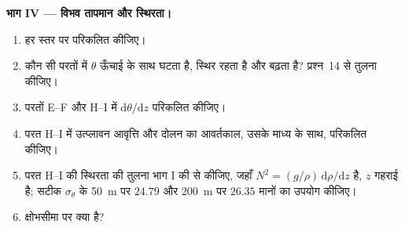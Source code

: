 \begin{problem}
\medskip
\noindent\textbf{भाग IV --- विभव तापमान और स्थिरता।}
\begin{enumerate}[resume]
  \item हर स्तर पर  परिकलित कीजिए।
  \item कौन सी परतों में $\theta$ ऊँचाई के साथ घटता है, स्थिर रहता है और बढ़ता है? प्रश्न~14 से तुलना कीजिए।
  \item परतों E--F और H--I में $\mathrm d\theta/\mathrm dz$ परिकलित कीजिए।
  \item परत H--I में उत्प्लावन आवृत्ति और दोलन का आवर्तकाल, उसके माध्य  के साथ, परिकलित कीजिए।
  \item परत H--I की स्थिरता की तुलना भाग I की  से कीजिए, जहाँ $N^2 = (g/\rho)\,\mathrm d\rho/\mathrm dz$ है, $z$ गहराई है; सटीक $\sigma_\theta$ के \qty{50}{m} पर $24.79$ और \qty{200}{m} पर $26.35$ मानों का उपयोग कीजिए।
  \item क्षोभसीमा पर  क्या है?
\end{enumerate}
\end{problem}
